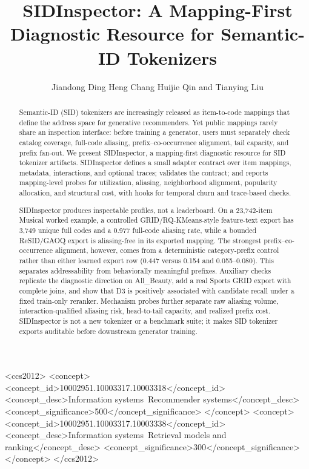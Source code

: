 \documentclass[sigconf,natbib=true]{acmart}
\title{SIDInspector: A Mapping-First Diagnostic Resource for Semantic-ID Tokenizers}
\author{Jiandong Ding\emailcomma{} Heng Chang\emailcomma{} Huijie Qin\emailcomma{} and Tianying Liu}
\affiliation{%
  \institution{Huawei Technologies}
  \city{Shanghai}
  \country{China}
}
\newcommand{\tool}{SIDInspector\xspace}
\newcommand{\sid}{SID\xspace}
\begin{document}
\begin{CCSXML}
<ccs2012>
 <concept>
  <concept_id>10002951.10003317.10003318</concept_id>
  <concept_desc>Information systems~Recommender systems</concept_desc>
  <concept_significance>500</concept_significance>
 </concept>
 <concept>
  <concept_id>10002951.10003317.10003338</concept_id>
  <concept_desc>Information systems~Retrieval models and ranking</concept_desc>
  <concept_significance>300</concept_significance>
 </concept>
</ccs2012>
\end{CCSXML}


\begin{abstract}
Semantic-ID (\sid) tokenizers are increasingly released as item-to-code
mappings that define the address space for generative recommenders. Yet public
mappings rarely share an inspection interface: before training a generator,
users must separately check catalog coverage, full-code aliasing,
prefix--co-occurrence alignment, tail capacity, and prefix fan-out. We present
\tool, a mapping-first diagnostic resource for \sid tokenizer artifacts. \tool
defines a small adapter contract over item mappings, metadata, interactions,
and optional traces; validates the contract; and reports
mapping-level probes for utilization, aliasing, neighborhood alignment,
popularity allocation, and structural cost, with hooks for temporal churn and
trace-based checks.

\tool produces inspectable profiles, not a leaderboard. On a 23,742-item
Musical worked example, a controlled GRID/RQ-KMeans-style feature-text export
has 3,749 unique full codes and a 0.977 full-code aliasing rate, while a
bounded ReSID/GAOQ export is aliasing-free in its exported mapping. The
strongest prefix--co-occurrence alignment, however, comes from a deterministic
category-prefix control rather than either learned export row (0.447 versus
0.154 and 0.055--0.080). This separates addressability from behaviorally
meaningful prefixes. Auxiliary checks replicate the diagnostic direction on
All\_Beauty, add a real Sports GRID export with complete joins, and show that
D3 is positively associated with candidate recall under a fixed train-only
reranker. Mechanism probes further separate raw aliasing volume,
interaction-qualified aliasing risk, head-to-tail capacity, and realized prefix
cost. \tool is not a new tokenizer or a benchmark suite; it makes \sid
tokenizer exports auditable before downstream generator training.
\end{abstract}
\end{document}
